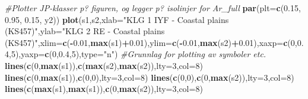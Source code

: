\documentclass[]{article}
\newenvironment{Shaded}{\begin{snugshade}}{\end{snugshade}}
\newcommand{\CommentTok}[1]{\textcolor[rgb]{0.56,0.35,0.01}{\textit{#1}}}
\newcommand{\DataTypeTok}[1]{\textcolor[rgb]{0.13,0.29,0.53}{#1}}
\newcommand{\DecValTok}[1]{\textcolor[rgb]{0.00,0.00,0.81}{#1}}
\newcommand{\FloatTok}[1]{\textcolor[rgb]{0.00,0.00,0.81}{#1}}
\newcommand{\KeywordTok}[1]{\textcolor[rgb]{0.13,0.29,0.53}{\textbf{#1}}}
\newcommand{\NormalTok}[1]{#1}
\newcommand{\OperatorTok}[1]{\textcolor[rgb]{0.81,0.36,0.00}{\textbf{#1}}}
\newcommand{\StringTok}[1]{\textcolor[rgb]{0.31,0.60,0.02}{#1}}
\begin{document}
\begin{Shaded}
\begin{Highlighting}[]
\CommentTok{#Plotter JP-klasser p? figuren, og legger p? isolinjer for Ar_full}
  \KeywordTok{par}\NormalTok{(}\DataTypeTok{plt=}\KeywordTok{c}\NormalTok{(}\FloatTok{0.15}\NormalTok{, }\FloatTok{0.95}\NormalTok{, }\FloatTok{0.15}\NormalTok{, y2))}
\KeywordTok{plot}\NormalTok{(s1,s2,}\DataTypeTok{xlab=}\StringTok{"KLG 1 IYF - Coastal plains (KS457)"}\NormalTok{,}\DataTypeTok{ylab=}\StringTok{"KLG 2 RE - Coastal plains (KS457)"}\NormalTok{,}\DataTypeTok{xlim=}\KeywordTok{c}\NormalTok{(}\OperatorTok{-}\FloatTok{0.01}\NormalTok{,}\KeywordTok{max}\NormalTok{(s1)}\OperatorTok{+}\FloatTok{0.01}\NormalTok{),}\DataTypeTok{ylim=}\KeywordTok{c}\NormalTok{(}\OperatorTok{-}\FloatTok{0.01}\NormalTok{,}\KeywordTok{max}\NormalTok{(s2)}\OperatorTok{+}\FloatTok{0.01}\NormalTok{),}\DataTypeTok{xaxp=}\KeywordTok{c}\NormalTok{(}\DecValTok{0}\NormalTok{,}\FloatTok{0.4}\NormalTok{,}\DecValTok{5}\NormalTok{),}\DataTypeTok{yaxp=}\KeywordTok{c}\NormalTok{(}\DecValTok{0}\NormalTok{,}\FloatTok{0.4}\NormalTok{,}\DecValTok{5}\NormalTok{),}\DataTypeTok{type=}\StringTok{"n"}\NormalTok{) }\CommentTok{#Grunnlag for plotting av symboler etc.}
\KeywordTok{lines}\NormalTok{(}\KeywordTok{c}\NormalTok{(}\DecValTok{0}\NormalTok{,}\KeywordTok{max}\NormalTok{(s1)),}\KeywordTok{c}\NormalTok{(}\KeywordTok{max}\NormalTok{(s2),}\KeywordTok{max}\NormalTok{(s2)),}\DataTypeTok{lty=}\DecValTok{3}\NormalTok{,}\DataTypeTok{col=}\DecValTok{8}\NormalTok{)}
\KeywordTok{lines}\NormalTok{(}\KeywordTok{c}\NormalTok{(}\DecValTok{0}\NormalTok{,}\KeywordTok{max}\NormalTok{(s1)),}\KeywordTok{c}\NormalTok{(}\DecValTok{0}\NormalTok{,}\DecValTok{0}\NormalTok{),}\DataTypeTok{lty=}\DecValTok{3}\NormalTok{,}\DataTypeTok{col=}\DecValTok{8}\NormalTok{)}
\KeywordTok{lines}\NormalTok{(}\KeywordTok{c}\NormalTok{(}\DecValTok{0}\NormalTok{,}\DecValTok{0}\NormalTok{),}\KeywordTok{c}\NormalTok{(}\DecValTok{0}\NormalTok{,}\KeywordTok{max}\NormalTok{(s2)),}\DataTypeTok{lty=}\DecValTok{3}\NormalTok{,}\DataTypeTok{col=}\DecValTok{8}\NormalTok{)}
\KeywordTok{lines}\NormalTok{(}\KeywordTok{c}\NormalTok{(}\KeywordTok{max}\NormalTok{(s1),}\KeywordTok{max}\NormalTok{(s1)),}\KeywordTok{c}\NormalTok{(}\DecValTok{0}\NormalTok{,}\KeywordTok{max}\NormalTok{(s2)),}\DataTypeTok{lty=}\DecValTok{3}\NormalTok{,}\DataTypeTok{col=}\DecValTok{8}\NormalTok{)}


\end{Highlighting}
\end{Shaded}
\end{document}
